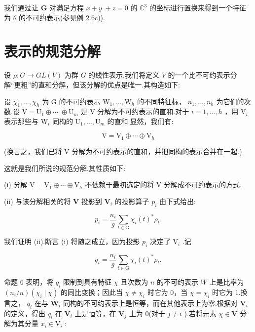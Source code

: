 我们通过让 \(\mathbf{G}\) 对满足方程 \(x + y \; + z = 0\) 的 \({\mathbb{C}}^{3}\) 的坐标进行置换来得到一个特征为 \(\theta\) 的不可约表示(参见例 2.6c)).

\section{表示的规范分解}

设 \(\rho  : G \rightarrow  {GL}\left( V\right)\) 为群 \(G\) 的线性表示.我们将定义 \(V\) 的一个比不可约表示分解“更粗”的直和分解，但该分解的优点是唯一.其构造如下:

设 \({\chi }_{1},\ldots ,{\chi }_{h}\) 为 \(\mathrm{G}\) 的不可约表示 \({\mathrm{W}}_{1},\ldots ,{\mathrm{W}}_{h}\) 的不同特征标， \({n}_{1},\ldots ,{n}_{h}\) 为它们的次数.设 \(\mathrm{V} = {\mathrm{U}}_{1} \oplus  \cdots \; \oplus  {\mathrm{U}}_{m}\) 是 \(\mathrm{V}\) 分解为不可约表示的直和.对于 \(i = 1,\ldots ,h\) ，用 \({\mathrm{V}}_{i}\) 表示那些与 \({\mathrm{W}}_{i}\) 同构的 \({\mathrm{U}}_{1},\ldots ,{\mathrm{U}}_{m}\) 的直和.显然，我们有:

\[
\mathrm{V} = {\mathrm{V}}_{1} \oplus  \cdots  \oplus  {\mathrm{V}}_{h}
\]

(换言之，我们已将 V 分解为不可约表示的直和，并把同构的表示合并在一起.)

这就是我们所说的规范分解.其性质如下:

\begin{theorem}[]
    (i) 分解 \(\mathrm{V} = {\mathrm{V}}_{1} \oplus  \cdots  \oplus  {\mathrm{V}}_{h}\) 不依赖于最初选定的将 \(\mathrm{V}\) 分解成不可约表示的方式.

(ii) 与该分解相关的将 \(\mathbf{V}\) 投影到 \({\mathbf{V}}_{i}\) 的投影算子 \({p}_{i}\) 由下式给出:

\[
{p}_{i} = \frac{{n}_{i}}{g}\mathop{\sum }\limits_{{t \in  \mathrm{G}}}{\chi }_{i}{\left( t\right) }^{ * }{\rho }_{t}.
\]
\end{theorem}



我们证明 (ii).断言 (i) 将随之成立，因为投影 \({p}_{i}\) 决定了 \({\mathrm{V}}_{i}\) .记

\[
{q}_{i} = \frac{{n}_{i}}{g}\mathop{\sum }\limits_{{t \in  \mathrm{G}}}{\chi }_{i}{\left( t\right) }^{ * }{\rho }_{t}.
\]

命题 6 表明，将 \({q}_{i}\) 限制到具有特征 \(\chi\) 且次数为 \(n\) 的不可约表示 \(W\) 上是比率为 \(\left( {{n}_{i}/n}\right) \left( {{\chi }_{i} \mid  \chi }\right)\) 的同比变换；因此当 \(\chi  \neq  {\chi }_{i}\) 时它为 0，当 \(\chi  = {\chi }_{i}\) 时它为 1.换言之， \({q}_{i}\) 在与 \({\mathbf{W}}_{i}\) 同构的不可约表示上是恒等，而在其他表示上为零.根据对 \({\mathbf{V}}_{i}\) 的定义，得出 \({q}_{i}\) 在 \({\mathbf{V}}_{i}\) 上是恒等，在 \({\mathbf{V}}_{j}\) 上为 0(对于 \(j \neq  i\) ).若将元素 \(\chi  \in  \mathbf{V}\) 分解为其分量 \({x}_{i} \in  {\mathrm{V}}_{i}\) :

